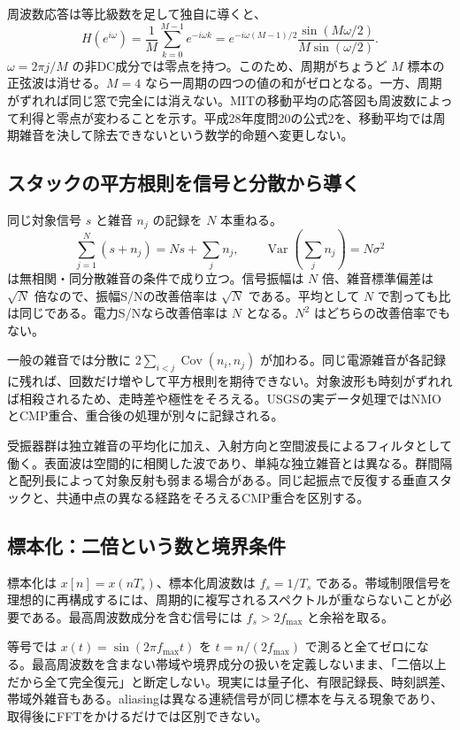 周波数応答は等比級数を足して独自に導くと、
\[
 H(e^{i\omega})=\frac1M\sum_{k=0}^{M-1}e^{-i\omega k}
 =e^{-i\omega(M-1)/2}\frac{\sin(M\omega/2)}{M\sin(\omega/2)}.
\]
\(\omega=2\pi j/M\) の非DC成分では零点を持つ。このため、周期がちょうど \(M\) 標本の正弦波は消せる。\(M=4\) なら一周期の四つの値の和がゼロとなる。一方、周期がずれれば同じ窓で完全には消えない。MITの移動平均の応答図も周波数によって利得と零点が変わることを示す\cite{mit_moving2012}。平成28年度問20の公式2を、移動平均では周期雑音を決して除去できないという数学的命題へ変更しない。

\subsection{スタックの平方根則を信号と分散から導く}
\label{theory:exploration:stack}
同じ対象信号 \(s\) と雑音 \(n_j\) の記録を \(N\) 本重ねる。
\[
 \sum_{j=1}^{N}(s+n_j)=Ns+\sum_jn_j,
 \qquad \operatorname{Var}\!\left(\sum_jn_j\right)=N\sigma^2
\]
は無相関・同分散雑音の条件で成り立つ。信号振幅は \(N\) 倍、雑音標準偏差は \(\sqrt N\) 倍なので、振幅S/Nの改善倍率は \(\sqrt N\) である。平均として \(N\) で割っても比は同じである。電力S/Nなら改善倍率は \(N\) となる。\(N^2\) はどちらの改善倍率でもない。

一般の雑音では分散に \(2\sum_{i<j}\operatorname{Cov}(n_i,n_j)\) が加わる。同じ電源雑音が各記録に残れば、回数だけ増やして平方根則を期待できない。対象波形も時刻がずれれば相殺されるため、走時差や極性をそろえる。USGSの実データ処理ではNMOとCMP重合、重合後の処理が別々に記録される\cite{usgs_processing2000}。

受振器群は独立雑音の平均化に加え、入射方向と空間波長によるフィルタとして働く。表面波は空間的に相関した波であり、単純な独立雑音とは異なる。群間隔と配列長によって対象反射も弱まる場合がある。同じ起振点で反復する垂直スタックと、共通中点の異なる経路をそろえるCMP重合を区別する。

\subsection{標本化：二倍という数と境界条件}
\label{theory:exploration:sampling}
標本化は \(x[n]=x(nT_s)\)、標本化周波数は \(f_s=1/T_s\) である。帯域制限信号を理想的に再構成するには、周期的に複写されるスペクトルが重ならないことが必要である。最高周波数成分を含む信号には \(f_s>2f_{\max}\) と余裕を取る\cite{mit_signals2010}。

等号では \(x(t)=\sin(2\pi f_{\max}t)\) を \(t=n/(2f_{\max})\) で測ると全てゼロになる。最高周波数を含まない帯域や境界成分の扱いを定義しないまま、「二倍以上だから全て完全復元」と断定しない。現実には量子化、有限記録長、時刻誤差、帯域外雑音もある。aliasingは異なる連続信号が同じ標本を与える現象であり、取得後にFFTをかけるだけでは区別できない。

